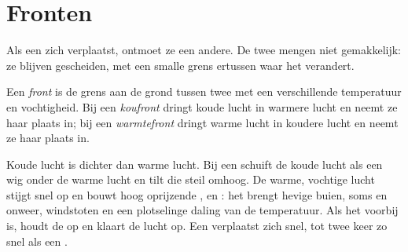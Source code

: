 \section{Fronten}

Als een  zich verplaatst, ontmoet ze een andere. De twee mengen
niet gemakkelijk: ze blijven gescheiden, met een smalle grens ertussen waar
het  verandert.

\begin{definition}[Front]\label{def:g8:fronts-and-weather-maps:front}
Een \emph{front} is de grens aan de grond tussen twee
 met een verschillende temperatuur en vochtigheid. Bij een
\emph{koufront} dringt koude lucht in warmere lucht en
neemt ze haar plaats in; bij een \emph{warmtefront}
dringt warme lucht in koudere lucht en neemt ze haar plaats in.
\end{definition}

Koude lucht is dichter dan warme lucht. Bij een  schuift de koude
lucht als een wig onder de warme lucht en tilt die steil omhoog. De warme,
vochtige lucht stijgt snel op en bouwt hoog oprijzende ,  en
: het  brengt hevige buien, soms  en onweer,
windstoten en een plotselinge daling van de temperatuur. Als het voorbij
is, houdt de  op en klaart de lucht op. Een  verplaatst zich
snel, tot twee keer zo snel als een .

